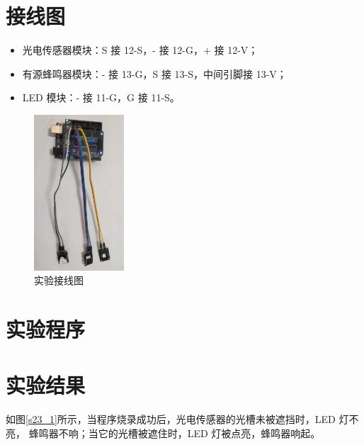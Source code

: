 \documentclass[UTF8, oneside]{ctexbook}
\begin{document}
\section{接线图}
\begin{itemize}
    \item 光电传感器模块：S 接 12-S，- 接 12-G，+ 接 12-V；
    \item 有源蜂鸣器模块：- 接 13-G，S 接 13-S，中间引脚接 13-V；
    \item LED 模块：- 接 11-G，G 接 11-S。
\end{itemize}
\begin{figure}[h]
    \centering
    \includegraphics[width=0.3\textwidth]{./result/sensor/23/lines2.png}
    \caption{实验接线图}
    \label{s23_line}
\end{figure}

\newpage
\section{实验程序}


\section{实验结果}
\paragraph{}
如图\ref{s23_1}所示，当程序烧录成功后，光电传感器的光槽未被遮挡时，LED 灯不亮，
蜂鸣器不响；当它的光槽被遮住时，LED 灯被点亮，蜂鸣器响起。
\newpage
\end{document}
